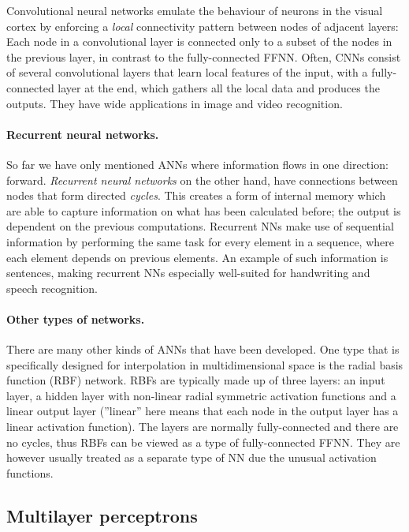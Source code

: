 \documentclass[%
oneside,                 %
final,                   %
10pt]{article}
\begin{document}
Convolutional neural networks emulate the behaviour of neurons in the
visual cortex by enforcing a \emph{local} connectivity pattern between
nodes of adjacent layers: Each node in a convolutional layer is
connected only to a subset of the nodes in the previous layer, in
contrast to the fully-connected FFNN.  Often, CNNs consist of several
convolutional layers that learn local features of the input, with a
fully-connected layer at the end, which gathers all the local data and
produces the outputs. They have wide applications in image and video
recognition.

\paragraph{Recurrent neural networks.}
So far we have only mentioned ANNs where information flows in one
direction: forward. \emph{Recurrent neural networks} on the other hand,
have connections between nodes that form directed \emph{cycles}. This
creates a form of internal memory which are able to capture
information on what has been calculated before; the output is
dependent on the previous computations. Recurrent NNs make use of
sequential information by performing the same task for every element
in a sequence, where each element depends on previous elements. An
example of such information is sentences, making recurrent NNs
especially well-suited for handwriting and speech recognition.

\paragraph{Other types of networks.}
There are many other kinds of ANNs that have been developed. One type
that is specifically designed for interpolation in multidimensional
space is the radial basis function (RBF) network. RBFs are typically
made up of three layers: an input layer, a hidden layer with
non-linear radial symmetric activation functions and a linear output
layer (''linear'' here means that each node in the output layer has a
linear activation function). The layers are normally fully-connected
and there are no cycles, thus RBFs can be viewed as a type of
fully-connected FFNN. They are however usually treated as a separate
type of NN due the unusual activation functions.

\subsection{Multilayer perceptrons}
\end{document}
